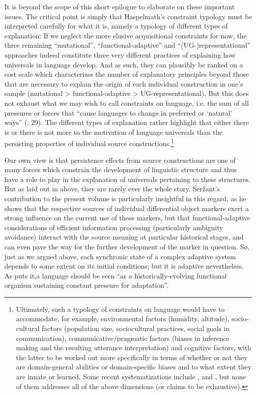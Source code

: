 \documentclass[output=paper]{langsci/langscibook}
\begin{document}
It is beyond the scope of this short epilogue to elaborate on these important issues. The critical point is simply that Haspelmath’s constraint typology must be interpreted carefully for what it is, namely a typology of different types of explanation: If we neglect the more elusive acquisitional constraints for now, the three remaining “mutational”, “functional-adaptive” and “(UG-)representational” approaches indeed constitute three very different practices of explaining how universals in language develop. And as such, they can plausibly be ranked on a cost scale which characterizes the number of explanatory principles beyond those that are necessary to explain the origin of each individual construction in one’s sample (mutational > functional-adaptive > UG-representational). But this does not exhaust what we may wish to call constraints on language, i.e. the sum of all pressures or forces that “cause languages to change in preferred or ‘natural’ ways” (\citealt{BickelEtAl2015}: 29). The different types of explanation rather highlight that either there is or there is not more to the motivation of language universals than the persisting properties of individual source constructions.\footnote{Ultimately, such a typology of constraints on language would have to accommodate, for example, environmental factors (humidity, altitude), socio-cultural factors (population size, sociocultural practices, social goals in communication), communicative/pragmatic factors (biases in inference making and the resulting utterance interpretation) and cognitive factors, with the latter to be worked out more specifically in terms of whether or not they are domain-general abilities or domain-specific biases and to what extent they are innate or learned. Some recent systematizations include \citet{ChristiansenChater2008}, \citet{EvansLevinson2009} and \citet{Bybee2010}, but none of them addresses all of the above dimensions (or claims to be exhaustive).} 

Our own view is that persistence effects from source constructions are one of many forces which constrain the development of linguistic structure and thus have a role to play in the explanation of universals pertaining to these structures. But as laid out in  above, they are rarely ever the whole story. Seržant’s contribution to the present volume is particularly insightful in this regard, as he shows that the respective sources of individual differential object markers exert a strong influence on the current use of these markers, but that functional-adaptive considerations of efficient information processing (particularly ambiguity avoidance) interact with the source meaning at particular historical stages, and can even pave the way for the further development of the marker in question. So, just as we argued above, each synchronic state of a complex adaptive system depends to some extent on its initial conditions; but it is adaptive nevertheless. As \citet[263]{Shibatani2006} puts it,\largerpage a language should be seen “as a historically-evolving functional organism sustaining constant pressure for adaptation”. 
\end{document}
